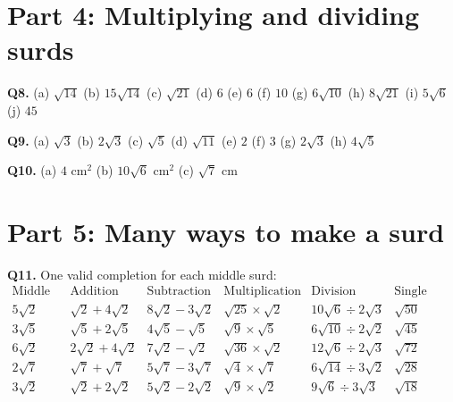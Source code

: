\documentclass[12pt,a4paper]{article}
\begin{document}
\section*{Part 4: Multiplying and dividing surds}

\textbf{Q8.}
(a) \(\sqrt{14}\)
(b) \(15\sqrt{14}\)
(c) \(\sqrt{21}\)
(d) \(6\)
(e) \(6\)
(f) \(10\)
(g) \(6\sqrt{10}\)
(h) \(8\sqrt{21}\)
(i) \(5\sqrt6\)
(j) \(45\)

\textbf{Q9.}
(a) \(\sqrt3\)
(b) \(2\sqrt3\)
(c) \(\sqrt5\)
(d) \(\sqrt{11}\)
(e) \(2\)
(f) \(3\)
(g) \(2\sqrt3\)
(h) \(4\sqrt5\)

\textbf{Q10.}
(a) \(4\text{ cm}^2\)
(b) \(10\sqrt6\text{ cm}^2\)
(c) \(\sqrt7\text{ cm}\)

\section*{Part 5: Many ways to make a surd}

\textbf{Q11.} One valid completion for each middle surd:
\[
\begin{array}{c|c|c|c|c|c}
\text{Middle surd} & \text{Addition} & \text{Subtraction} & \text{Multiplication} & \text{Division} & \text{Single square root}\\
\hline
5\sqrt2 & \sqrt2+4\sqrt2 & 8\sqrt2-3\sqrt2 & \sqrt{25}\times\sqrt2 & 10\sqrt6\div2\sqrt3 & \sqrt{50}\\
3\sqrt5 & \sqrt5+2\sqrt5 & 4\sqrt5-\sqrt5 & \sqrt9\times\sqrt5 & 6\sqrt{10}\div2\sqrt2 & \sqrt{45}\\
6\sqrt2 & 2\sqrt2+4\sqrt2 & 7\sqrt2-\sqrt2 & \sqrt{36}\times\sqrt2 & 12\sqrt6\div2\sqrt3 & \sqrt{72}\\
2\sqrt7 & \sqrt7+\sqrt7 & 5\sqrt7-3\sqrt7 & \sqrt4\times\sqrt7 & 6\sqrt{14}\div3\sqrt2 & \sqrt{28}\\
3\sqrt2 & \sqrt2+2\sqrt2 & 5\sqrt2-2\sqrt2 & \sqrt9\times\sqrt2 & 9\sqrt6\div3\sqrt3 & \sqrt{18}
\end{array}
\]
\end{document}
